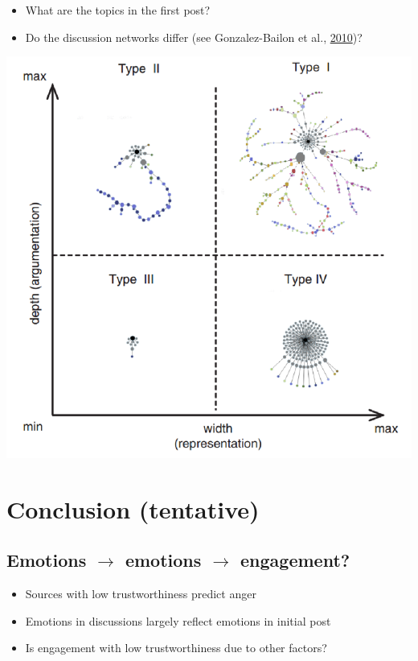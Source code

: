 \documentclass[
  letterpaper,
  DIV=11,
  numbers=noendperiod]{scrartcl}
\providecommand{\tightlist}{%
  \setlength{\itemsep}{0pt}\setlength{\parskip}{0pt}}\usepackage{longtable,booktabs,array}
\begin{document}
\begin{itemize}
\item
  What are the topics in the first post?
\item
  Do the discussion networks differ (see Gonzalez-Bailon et al.,
  \href{https://doi.org/10.1057/jit.2010.2}{2010})?
\end{itemize}

\includegraphics[width=7.29167in,height=\textheight]{images/four-types-of-discussions.png}

\hypertarget{conclusion-tentative}{%
\section{Conclusion (tentative)}\label{conclusion-tentative}}

\hypertarget{emotions-rightarrow-emotions-rightarrow-engagement}{%
\subsection{\texorpdfstring{Emotions \(\rightarrow\) emotions
\(\rightarrow\)
engagement?}{Emotions \textbackslash rightarrow emotions \textbackslash rightarrow engagement?}}\label{emotions-rightarrow-emotions-rightarrow-engagement}}

\begin{itemize}
\tightlist
\item
  Sources with low trustworthiness predict anger
\item
  Emotions in discussions largely reflect emotions in initial post
\item
  Is engagement with low trustworthiness due to other factors?
\end{itemize}
\end{document}
